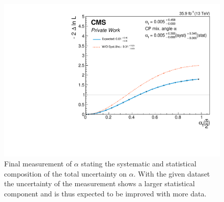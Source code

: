 \begin{figure}[h!]
    \centering
        \includegraphics[width=.6\textwidth]{Figures/statana/Scan_JEC_mela3D/alpha_breakdown.pdf}
    \caption[Uncertainty breakdown of the CP mixing angle measurement.]{Final measurement of $\alpha$ stating the systematic and statistical composition of the total uncertainty on $\alpha$. With the given dataset the uncertainty of the measurement shows a larger statistical component and is thus expected to be improved with more data.}\label{statana:scan_alpha_breakdown}
\end{figure}

